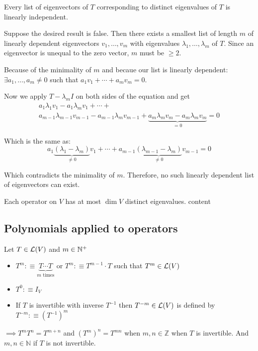 \setcounter{thm}{10}
\begin{thm}
  \label{thm: linearly independent eigenvectors}
  Every list of eigenvectors of $T$ corresponding to distinct eigenvalues of $T$ is linearly independent.
\end{thm}
\begin{prf}
  Suppose the desired result is false. Then there exists a smallest list of length $m$ of linearly dependent eigenvectors $v_1, \dots, v_m$ with eigenvalues $\lambda_1, \dots, \lambda_m$ of $T$. Since an eigenvector is unequal to the zero vector, $m$ must be $\geq 2$.

  Because of the minimality of $m$ and becaue our list is linearly dependent: $\exists a_1, \dots, a_m \neq 0$ such that $a_1 v_1 + \cdots + a_m v_m = 0$. 
  
  Now we apply $T-\lambda_m I$ on both sides of the equation and get
  \begin{equation}
    \begin{gathered}
      a_1 \lambda_1 v_1 - a_1 \lambda_m v_1
      + \cdots + \\
      a_{m-1} \lambda_{m-1} v_{m-1} - a_{m-1} \lambda_{m} v_{m-1} +
      \underbrace{a_m \lambda_m v_m -a_m \lambda_m v_m}_{=0} =0
    \end{gathered}
  \end{equation}

  Which is the same as:
  \begin{equation}
    a_1 \underbrace{(\lambda_1 - \lambda_m)}_{\neq 0} v_1 + \cdots + a_{m-1} \underbrace{(\lambda_{m-1}-\lambda_{m})}_{\neq 0} v_{m-1}=0
  \end{equation}

  Which contradicts the minimality of $m$. Therefore, no such linearly dependent list of eigenvectors can exist.
  
\end{prf}

\begin{thm}
  Each operator on $V$ has at most $\dim V$ distinct eigenvalues.
  content
\end{thm}


\subsection{Polynomials applied to operators}

\setcounter{thm}{12}
\begin{mydef}
  Let $T \in \mathcal{L}(V)$ and $m\in \mathbb{N}^{+}$
  \begin{itemize}
    \item $T^{m} :\equiv \underbrace{T \cdots T}_{\text{$m$ times}}$ or $T^{m} :\equiv T^{m-1} \cdot T$ such that $T^{m} \in \mathcal{L}(V)$
    \item $T^0 :\equiv I_V$
    \item If $T$ is invertible with inverse $T^{-1}$ then $T^{-m}\in \mathcal{L}(V)$ is defined by $T^{-m} :\equiv (T^{-1})^m$
  \end{itemize}
\end{mydef}
$\implies T^m T^n = T^{m+n}$ and $(T^m)^n=T^{mn}$ when $m,n \in \mathbb{Z}$ when $T$ is invertible. And $m,n \in \mathbb{N}$ if $T$ is not invertible.

